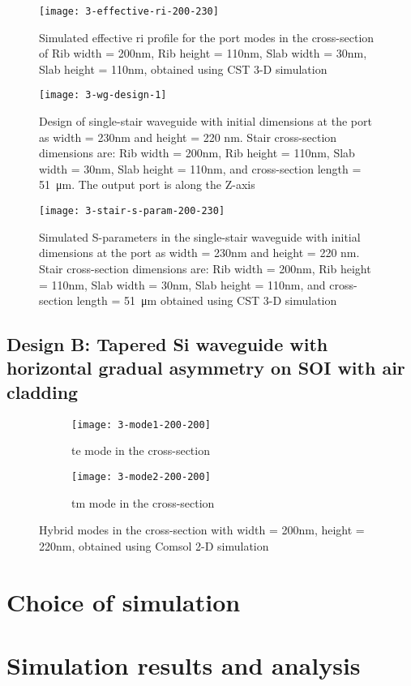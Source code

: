 \documentclass[../report.tex]{subfiles}
\begin{document}
\begin{figure}[H] %
	\centering
	\texttt{[image: 3-effective-ri-200-230]}
	\caption{Simulated effective \gls{ri} profile for the port modes in the cross-section of Rib width = 200nm, Rib height = 110nm, Slab width = 30nm, Slab height = 110nm, obtained using CST 3-D simulation}
	\label{fig:3_effective_ri_200_230}
\end{figure}


\begin{figure}[H] %
	\centering
	\texttt{[image: 3-wg-design-1]}
	\caption{Design of single-stair waveguide with initial dimensions at the port as width = 230nm and height = 220 nm. Stair cross-section dimensions are: Rib width = 200nm, Rib height = 110nm, Slab width = 30nm, Slab height = 110nm, and cross-section length = \SI{51}{\micro\meter}. The output port is along the Z-axis}
	\label{fig:3_wg_design_1}
\end{figure}

\begin{figure}[H] %
	\centering
	\texttt{[image: 3-stair-s-param-200-230]}
	\caption{Simulated S-parameters in the single-stair waveguide with initial dimensions at the port as width = 230nm and height = 220 nm. Stair cross-section dimensions are: Rib width = 200nm, Rib height = 110nm, Slab width = 30nm, Slab height = 110nm, and cross-section length = \SI{51}{\micro\meter} obtained using CST 3-D simulation}
	\label{fig:3_stair_s_param_200_230}
\end{figure}
				
		\subsection{Design B: Tapered Si waveguide with horizontal gradual asymmetry on SOI with air cladding}
		
\begin{figure}[H] %
	\begin{subfigure}[t]{0.45\textwidth}
		\texttt{[image: 3-mode1-200-200]}
		\caption{\gls{te} mode in the cross-section}
		\label{fig:3_mode1_200_200}
	\end{subfigure}
	\hfill
	\begin{subfigure}[t]{0.45\textwidth}
		\texttt{[image: 3-mode2-200-200]}
		\caption{\gls{tm} mode in the cross-section}
		\label{fig:3_mode2_200_200}
	\end{subfigure}
	\caption{Hybrid modes in the cross-section with width = 200nm, height = 220nm, obtained using Comsol 2-D simulation}
\end{figure}
	
	\section{Choice of simulation}
	
	\section{Simulation results and analysis}
	
\end{document}
